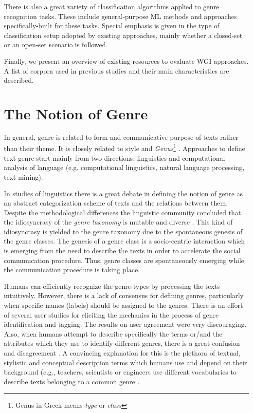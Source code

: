 There is also a great variety of classification algorithms applied to genre recognition tasks. These include general-purpose ML methods and approaches specifically-built for these tasks. Special emphasis is given in the type of classification setup adopted by existing approaches, mainly whether a closed-set or an open-set scenario is followed.

Finally, we present an overview of existing resources to evaluate WGI approaches. A list of corpora used in previous studies and their main characteristics are described. 

\section{The Notion of Genre}
\label{chap:relevant_work:sec:definitions}

In general, genre is related to form and communicative purpose of texts rather than their theme. It is closely related to style and \textit{Genus}\footnote{Genus in Greek means \textit{type} or \textit{class}} \parencite{sugiyanto2014term}. Approaches to define text genre start mainly from two directions: linguistics and computational analysis of language (e.g. computational linguistics, natural language processing, text mining). 

In studies of linguistics there is a great debate in defining the notion of genre as an abstract categorization scheme of texts and the relations between them. Despite the methodological differences the linguistic community concluded that the idiosyncrasy of the \textit{genre taxonomy} is mutable and diverse \parencite{coutinho2009describe}. This kind of idiosyncrasy is yielded to the genre taxonomy due to the spontaneous genesis of the genre classes. The genesis of a genre class is a socio-centric interaction which is emerging from the need to describe the texts in order to accelerate the social communication procedure. Thus, genre classes are spontaneously emerging while the communication procedure is taking place.

Humans can efficiently recognize the genre-types by processing the texts intuitively. However, there is a lack of consensus for defining genres, particularly when specific names (labels) should be assigned to the genres. There is an effort of several user studies for eliciting the mechanics in the process of genre identification and tagging. The results on user agreement were very discouraging. Also, when humans attempt to describe specifically the terms or/and the attributes which they use to identify different genres, there is a great confusion and disagreement . A convincing explanation for this is the plethora of textual, stylistic and conceptual description terms which humans use and depend on their background (e.g., teachers, scientists or engineers use different vocabularies to describe texts belonging to a common genre \parencite{roussinov2001genre, crowston2011problems}. 

